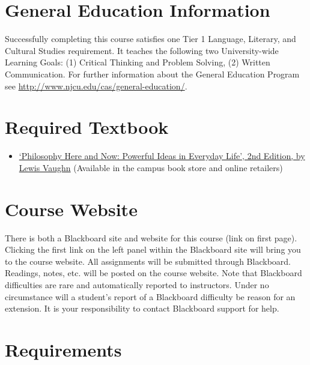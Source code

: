 \documentclass[article,oneside]{memoir}
\begin{document}
\section{General Education Information} 
Successfully completing this course satisfies one Tier 1 Language, Literary, and Cultural Studies requirement. It teaches the following two University-wide Learning Goals: (1) Critical Thinking and Problem Solving, (2) Written Communication. For further information about the General Education Program see \href{http://www.njcu.edu/cas/general-education/}{http://www.njcu.edu/cas/general-education/}.


\section{Required Textbook}

\begin{itemize}
\item
  \href{http://www.amazon.com/Philosophy-Here-Now-Powerful-Everyday/dp/0190207035/ref=dp_ob_title_bk}{`Philosophy  Here and Now: Powerful Ideas in Everyday Life', 2nd Edition, by Lewis Vaughn}  (Available in the campus book store and online retailers)
\end{itemize}


\section{Course Website}
There is both a Blackboard site and website for this course (link on first page). Clicking the first link on the left panel within the Blackboard site will bring you to the course website. All assignments will be submitted through Blackboard. Readings, notes, etc. will be posted on the course website. Note that Blackboard difficulties are rare and automatically reported to instructors. Under no circumstance will a student's report of a Blackboard difficulty be reason for an extension. It is your responsibility to contact Blackboard support for help.




\section{Requirements}
\end{document}
